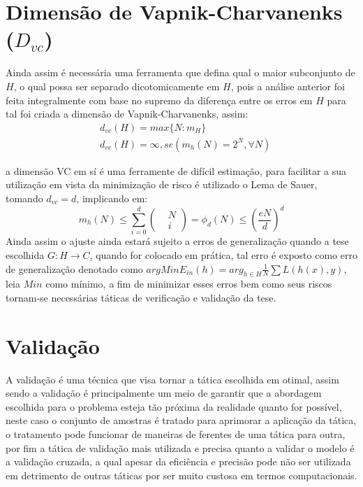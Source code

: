 \documentclass[pfc]{imetex}
\begin{document}
    \section{Dimensão de Vapnik-Charvanenks ($D_{vc}$)}

    Ainda assim é necessária uma ferramenta que defina qual o maior subconjunto de $H$, o qual possa ser separado dicotomicamente em $H$, pois a análise anterior foi feita integralmente com base no supremo da diferença entre os erros em $H$ para tal foi criada a dimensão de Vapnik-Charvanenks, assim:
    \begin{equation}
        \begin{split}
            & d_{vc}(H) = max\{N:m_H\} \\
            & d_{vc}(H) = \infty, se (m_h(N)=2^N, \forall N)
        \end{split}
    \end{equation}

    a dimensão VC em sí é uma ferramente de difícil estimação, para facilitar a sua utilização em vista da minimização de risco  é utilizado o Lema de Sauer, tomando $d_{vc}=d$, implicando em:
    \begin{equation}
        m_h(N) \leq \sum_{i=0}^d {\left(\begin{split} & N \\ & i\end{split}\right)} = \phi_d(N) \leq \left( \frac{eN}{d} \right)^d
    \end{equation}
    Ainda assim o ajuste ainda estará sujeito a erros de generalização quando a tese escolhida $G: H \rightarrow C$, quando for colocado em prática, tal erro é exposto como erro de generalização denotado como $arg Min E_{in}(h) = arg_{h \in H} \frac{1}{N}\sum L(h(x),y) $, leia $Min$ como mínimo, a fim de minimizar esses erros bem como seus riscos tornam-se necessárias táticas de verificação e validação da tese.

    \section{Validação}

    A validação é uma técnica que visa tornar a tática escolhida em otimal, assim sendo a validação é principalmente um meio de garantir que a abordagem escolhida para o problema esteja tão próxima da realidade quanto for possível, neste caso o conjunto de amostras é tratado para aprimorar a aplicação da tática, o tratamento pode funcionar de maneiras de ferentes de uma tática para outra, por fim a tática de validação mais utilizada e precisa quanto a validar o modelo é a validação cruzada, a qual apesar da eficiência e precisão pode não ser utilizada em detrimento de outras táticas por ser muito custosa em termos computacionais.
\end{document}

